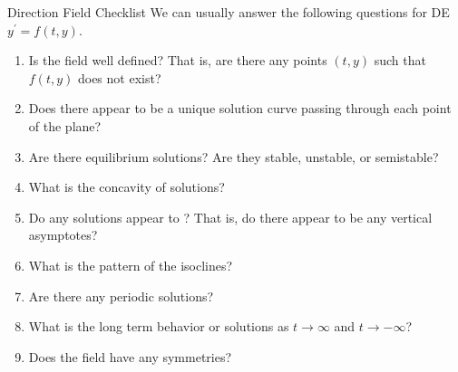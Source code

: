 \documentclass{beamer}
\begin{document}
\begin{frame}
\begin{block}{Direction Field Checklist}
We can usually answer the following questions for DE $y^\prime=f(t,y)$.
\begin{enumerate}[<+- | alert@+>]
\item Is the field well defined? That is, are there any points $(t,y)$ such that $f(t,y)$ does not exist?
\item Does there appear to be a unique solution curve passing through each point of the plane?
\item Are there equilibrium solutions? Are they stable, unstable, or semistable?
\item What is the concavity of solutions?
\item Do any solutions appear to ? That is, do there appear to be any vertical asymptotes?
\item What is the pattern of the isoclines?
\item Are there any periodic solutions?
\item What is the long term behavior or solutions as $t\rightarrow\infty$ and $t\rightarrow-\infty$?
\item Does the field have any symmetries?
\end{enumerate}
\end{block}
\end{frame}
\end{document}
